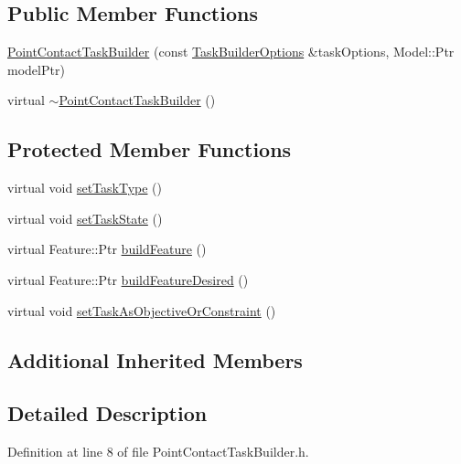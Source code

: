 \subsection*{Public Member Functions}
\begin{DoxyCompactItemize}
\item 
\hyperlink{classocra_1_1PointContactTaskBuilder_a36712065646f637a772e84443ea6bb44}{Point\+Contact\+Task\+Builder} (const \hyperlink{classocra_1_1TaskBuilderOptions}{Task\+Builder\+Options} \&task\+Options, Model\+::\+Ptr model\+Ptr)
\item 
virtual \hyperlink{classocra_1_1PointContactTaskBuilder_a33923536a7481e117db39cc4bc7a9d75}{$\sim$\+Point\+Contact\+Task\+Builder} ()
\end{DoxyCompactItemize}
\subsection*{Protected Member Functions}
\begin{DoxyCompactItemize}
\item 
virtual void \hyperlink{classocra_1_1PointContactTaskBuilder_a88d7c619f00708c1b3472ee7dc373f96}{set\+Task\+Type} ()
\item 
virtual void \hyperlink{classocra_1_1PointContactTaskBuilder_a073506c0c849ad4ebd40aebef37f280d}{set\+Task\+State} ()
\item 
virtual Feature\+::\+Ptr \hyperlink{classocra_1_1PointContactTaskBuilder_a220c35d105a88cd0e2407779ab1556f2}{build\+Feature} ()
\item 
virtual Feature\+::\+Ptr \hyperlink{classocra_1_1PointContactTaskBuilder_a253f8fffbd548b63badee23e2c42eb95}{build\+Feature\+Desired} ()
\item 
virtual void \hyperlink{classocra_1_1PointContactTaskBuilder_a729f50dc73c00accb86a9480cb3054fd}{set\+Task\+As\+Objective\+Or\+Constraint} ()
\end{DoxyCompactItemize}
\subsection*{Additional Inherited Members}


\subsection{Detailed Description}


Definition at line 8 of file Point\+Contact\+Task\+Builder.\+h.



